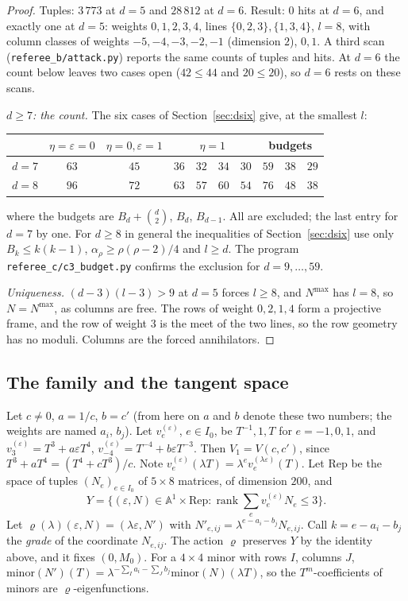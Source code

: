 \documentclass[11pt,a4paper]{article}
\theoremstyle{plain}
\theoremstyle{definition}
\newcommand{\rk}{\operatorname{rank}}
\newcommand{\Aff}{\mathbb{A}^{1}}
\newcommand{\Rep}{\mathrm{Rep}}
\newcommand{\Iz}{I_{0}}
\newcommand{\scr}[1]{\nolinkurl{#1}}
\begin{document}
\begin{proof}
Tuples: $3\,773$ at $d=5$ and $28\,812$ at $d=6$. Result: $0$ hits at $d=6$, and exactly one at $d=5$: weights $0,1,2,3,4$, lines $\{0,2,3\},\{1,3,4\}$, $l=8$, with column classes of weights $-5,-4,-3,-2,-1$ (dimension $2$), $0,1$. A third scan (\scr{referee_b/attack.py}) reports the same counts of tuples and hits. At $d=6$ the count below leaves two cases open ($42\le44$ and $20\le20$), so $d=6$ rests on these scans.

\emph{$d\ge7$: the count.} The six cases of Section~\ref{sec:dsix} give, at the smallest $l$:
\begin{center}
\begin{tabular}{lcccccc|ccc}
 & $\eta{=}\varepsilon{=}0$ & $\eta{=}0,\varepsilon{=}1$ & \multicolumn{4}{c|}{$\eta=1$} & \multicolumn{3}{c}{budgets}\\\hline
$d=7$ & $63$ & $45$ & $36$ & $32$ & $34$ & $30$ & $59$ & $38$ & $29$\\
$d=8$ & $96$ & $72$ & $63$ & $57$ & $60$ & $54$ & $76$ & $48$ & $38$
\end{tabular}
\end{center}
where the budgets are $B_{d}+\binom{d}{2}$, $B_{d}$, $B_{d-1}$. All are excluded; the last entry for $d=7$ by one. For $d\ge8$ in general the inequalities of Section~\ref{sec:dsix} use only $B_{k}\le k(k-1)$, $\alpha_{\rho}\ge\rho(\rho-2)/4$ and $l\ge d$. The program \scr{referee_c/c3_budget.py} confirms the exclusion for $d=9,\dots,59$.

\emph{Uniqueness.} $(d-3)(l-3)>9$ at $d=5$ forces $l\ge8$, and $N^{\max}$ has $l=8$, so $N=N^{\max}$, as columns are free. The rows of weight $0,2,1,4$ form a projective frame, and the row of weight $3$ is the meet of the two lines, so the row geometry has no moduli. Columns are the forced annihilators.
\end{proof}

\subsection{The family and the tangent space}

Let $c\neq0$, $a=1/c$, $b=c'$ (from here on $a$ and $b$ denote these two numbers; the weights are named $a_{i}$, $b_{j}$). Let $v_{e}^{(\varepsilon)}$, $e\in\Iz$, be $T^{-1},1,T$ for $e=-1,0,1$, and $v_{3}^{(\varepsilon)}=T^{3}+a\varepsilon T^{4}$, $v_{-4}^{(\varepsilon)}=T^{-4}+b\varepsilon T^{-3}$. Then $V_{1}=V(c,c')$, since $T^{3}+aT^{4}=(T^{4}+cT^{3})/c$. Note $v_{e}^{(\varepsilon)}(\lambda T)=\lambda^{e}v_{e}^{(\lambda\varepsilon)}(T)$. Let $\Rep$ be the space of tuples $(N_{e})_{e\in\Iz}$ of $5\times8$ matrices, of dimension $200$, and
\[
Y=\{(\varepsilon,N)\in\Aff\times\Rep:\rk\sum_{e}v_{e}^{(\varepsilon)}N_{e}\le3\}.
\]
Let $\varrho(\lambda)(\varepsilon,N)=(\lambda\varepsilon,N')$ with $N'_{e,ij}=\lambda^{e-a_{i}-b_{j}}N_{e,ij}$. Call $k=e-a_{i}-b_{j}$ the \emph{grade} of the coordinate $N_{e,ij}$. The action $\varrho$ preserves $Y$ by the identity above, and it fixes $(0,M_{0})$. For a $4\times4$ minor with rows $I$, columns $J$, $\mathrm{minor}(N')(T)=\lambda^{-\sum_{I}a_{i}-\sum_{J}b_{j}}\mathrm{minor}(N)(\lambda T)$, so the $T^{m}$-coefficients of minors are $\varrho$-eigenfunctions.
\end{document}
